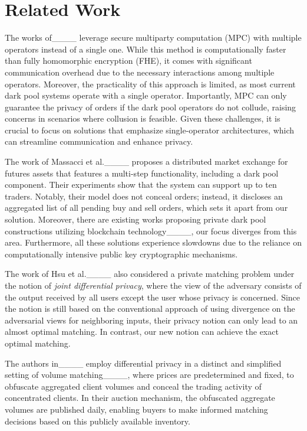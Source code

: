 \section{Related Work}
The works of____ leverage secure multiparty computation (MPC) with multiple operators instead of a single one. While this method is computationally faster than fully homomorphic encryption (FHE), it comes with significant communication overhead due to the necessary interactions among multiple operators. Moreover, the practicality of this approach is limited, as most current dark pool systems operate with a single operator. Importantly, MPC can only guarantee the privacy of orders if the dark pool operators do not collude, raising concerns in scenarios where collusion is feasible. Given these challenges, it is crucial to focus on solutions that emphasize single-operator architectures, which can streamline communication and enhance privacy.

The work of Massacci et al.____ proposes a distributed market exchange for futures assets that features a multi-step functionality, including a dark pool component. Their experiments show that the system can support up to ten traders. Notably, their model does not conceal orders; instead, it discloses an aggregated list of all pending buy and sell orders, which sets it apart from our solution. Moreover, there are existing works proposing private dark pool constructions utilizing blockchain technology____, our focus diverges from this area. Furthermore, all these solutions experience slowdowns due to the reliance on computationally intensive public key cryptographic mechanisms.


The work of Hsu et al.____ also considered a private matching problem under the notion of \emph{joint differential privacy}, where the view of the adversary consists of the output received by all users except the user whose privacy is concerned.
Since the notion is still based on the conventional approach of using divergence on the adversarial views for neighboring inputs, their privacy notion can only lead to an almost optimal matching. In contrast, our new notion can achieve the exact optimal matching.


The authors in____ employ differential privacy in a distinct and simplified setting of volume matching____, where prices are predetermined and fixed, to obfuscate aggregated client volumes and conceal the trading activity of concentrated clients. In their auction mechanism, the obfuscated aggregate volumes are published daily, enabling buyers to make informed matching decisions based on this publicly available inventory.
